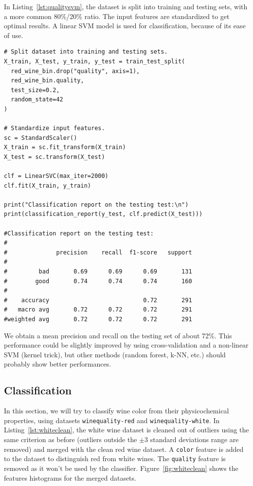 \documentclass[12pt]{article}
\begin{document}
  In Listing~\ref{lst:qualitysvm}, the dataset is split into training and
  testing sets, with a more common 80\%/20\% ratio. The input features are
  standardized to get optimal results. A linear SVM model is used for
  classification, because of its ease of use.
  
  \newpage

  \begin{lstlisting}[caption={Linear SVM classifier of red wine quality.},
    captionpos=b, label={lst:qualitysvm}]
# Split dataset into training and testing sets.
X_train, X_test, y_train, y_test = train_test_split(
  red_wine_bin.drop("quality", axis=1), 
  red_wine_bin.quality, 
  test_size=0.2, 
  random_state=42
)

# Standardize input features.
sc = StandardScaler()
X_train = sc.fit_transform(X_train)
X_test = sc.transform(X_test)

clf = LinearSVC(max_iter=2000)
clf.fit(X_train, y_train)

print("Classification report on the testing test:\n")
print(classification_report(y_test, clf.predict(X_test)))

#Classification report on the testing test:
#
#              precision    recall  f1-score   support
#
#         bad       0.69      0.69      0.69       131
#        good       0.74      0.74      0.74       160
#
#    accuracy                           0.72       291
#   macro avg       0.72      0.72      0.72       291
#weighted avg       0.72      0.72      0.72       291
  \end{lstlisting}

  We obtain a mean precision and recall on the testing set of about 72\%. This
  performance could be slightly improved by using cross-validation and a
  non-linear SVM (kernel trick), but other methods (random forest, k-NN, etc.)
  should probably show better performances.

  \subsection{Classification}

  In this section, we will try to classify wine color from their
  physicochemical properties, using datasets \lstinline{winequality-red} and
  \lstinline{winequality-white}. In Listing~\ref{lst:whiteclean}, the white
  wine dataset is cleaned out of outliers using the same criterion as before
  (outliers outside the $\pm 3$ standard deviations range are removed) and
  merged with the clean red wine dataset. A \lstinline{color} feature is added
  to the dataset to distinguish red from white wines. The \lstinline{quality}
  feature is removed as it won't be used by the classifier.
  Figure~\ref{fig:whiteclean} shows the features histograms for the merged
  datasets.
\end{document}
